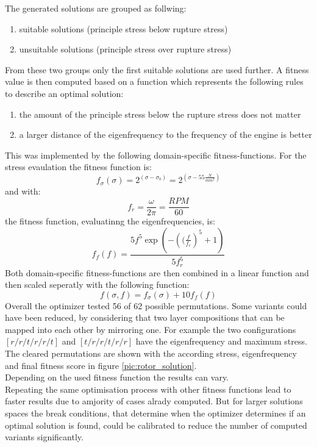 The generated solutions are grouped as follwing:
\begin{enumerate}
    \item suitable solutions (principle stress below rupture stress)
    \item unsuitable solutions (principle stress over rupture stress)
\end{enumerate}
From these two groups only the first suitable solutions are used further.
A fitness value is then computed based on a function which represents the following rules to describe an optimal solution:
\begin{enumerate}
    \item the amount of the principle stress below the rupture stress does not matter
    \item a larger distance of the eigenfrequency to the frequency of the engine is better
\end{enumerate}
This was implemented by the following domain-specific fitness-functions.
For the stress evaulation the fitness function is:
\begin{equation}
    \label{eq:fitness_stress}
    f_{\sigma}(\sigma)=2^{(\sigma-\sigma_{b})}=2^{(\sigma-55\frac{N}{mm^2})}
\end{equation}
and with:
\begin{equation}
    \label{eq:rotation_frequency}
    f_{r}=\frac{\omega}{2\pi}=\frac{RPM}{60}
\end{equation}
the fitness function, evaluatinng the eigenfrequencies, is:
\begin{equation}
    \label{eq:fitness_freq}
    f_{f}(f)=\frac{5 f^5 \exp{\left(-\left((\frac{f}{f_r}\right)^5 + 1\right)}}{5 f_r^5}
\end{equation}
Both domain-specific fitness-functions are then combined in a linear function 
and then scaled seperatly with the following function:
\begin{equation}
    \label{eq:fitness_final}
    f(\sigma,f)=f_{\sigma}(\sigma)+10f_{f}(f)
\end{equation}
Overall the optimizer tested 56 of 62 possible permutations.
Some variants could have been reduced, by considering that two layer compositions that can be mapped into each other by mirroring one.
For example the two configurations $[r/r/t/r/r/t]$ and $[t/r/r/t/r/r]$ have the eigenfrequency and maximum stress.
The cleared permutations are shown with the according stress, eigenfrequency and final fitness score in figure \ref{pic:rotor_solution}.\\
Depending on the used fitness function the results can vary.\\ 
Repeating the same optimisation process with other fitness functions lead to faster results due to amjority of cases alrady computed.
But for larger solutions spaces the break conditions, 
that determine when the optimizer determines if an optimal solution is found,
could be calibrated to reduce the number of computed variants significantly.
